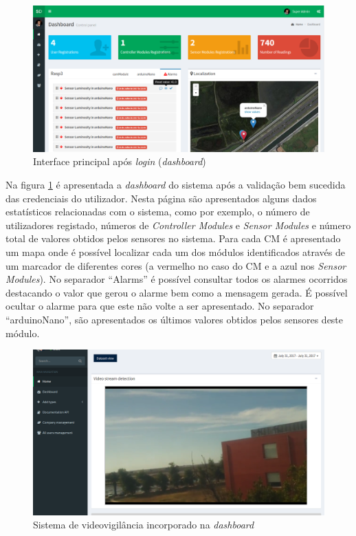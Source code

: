 \newpage

\begin{figure}[h]
	\centering
	\includegraphics[width=\linewidth]{prints-web/dashboard1.png}
	\caption{Interface principal após \textit{login} (\textit{dashboard})}
	\label{ddashboard}
\end{figure}




Na figura \ref{ddashboard} é apresentada a \textit{dashboard} do sistema após a validação bem sucedida das credenciais do utilizador. Nesta página são apresentados alguns dados estatísticos relacionadas com o sistema, como por exemplo, o número de utilizadores registado, números de \textit{Controller Modules} e \textit{Sensor Modules} e número total de valores obtidos pelos sensores no sistema. Para cada \acl{CM} é apresentado um mapa onde é possível localizar cada um dos módulos identificados através de um marcador de diferentes cores (a vermelho no caso do \acl{CM} e a azul nos \textit{Sensor Modules}). No separador ``Alarms''  é possível consultar todos os alarmes ocorridos destacando o valor que gerou o alarme bem como a mensagem gerada. É possível ocultar o alarme para que este não volte a ser apresentado. No separador ``arduinoNano'', são apresentados os últimos valores obtidos pelos sensores deste módulo. 


\begin{figure}[h]
	\centering
	\includegraphics[width=0.7\linewidth]{prints-web/stream.png}
	\caption{Sistema de videovigilância incorporado na \textit{dashboard}}
	\label{vigilancia}
\end{figure}







